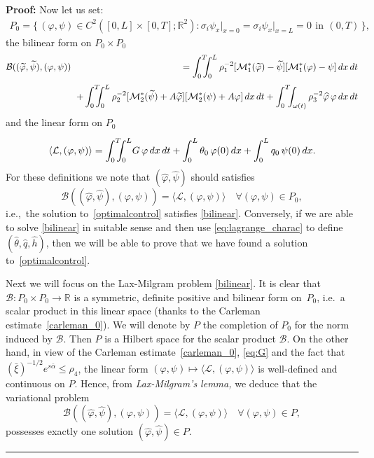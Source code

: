 \documentclass[10pt]{article}
\newenvironment{proof}[1][Proof]
{\noindent\textbf{#1:} }{\hfill\rule{0.5em}{0.5em}}
\def\dis{\displaystyle}
\def\om{\omega}
\def\\Phivec{\mathbf{\Phi}}
\newcommand{\iiTL}{\int_0^T\!\!\!\!\int_0^L }
\begin{document}
\begin{proof}
	Now let us set:
$$
\begin{array}{l}
	\dis P_0 = \bigg\{\, (\varphi,\psi)\in C^{2}([0,L] \times [0,T];\mathbb{R}^2) :
	\sigma_i\psi_{x}\big|_{x=0}=\sigma_i\psi_{x}\big|_{x=L}= 0 \,~\mbox{in}\,~(0,T)\,\bigg\},
\end{array}
$$
	the bilinear form on $P_0\times P_0$
\begin{eqnarray*}
	\mathcal{B}((\widetilde{\varphi},\widetilde{\psi}),(\varphi,\psi))\hspace{-0.5cm}&& \dis =  \iiTL\rho_1^{-2}[\mathcal{M}^*_1(\widetilde{\varphi})- \widetilde{\psi}]
	[\mathcal{M}^*_1(\varphi)-\psi]\,dx\,dt
	\\
	\noalign{\smallskip}
	& & \quad \dis
	+ \iiTL\rho_2^{-2}[\mathcal{M}^*_2(\widetilde{\psi})+A \widetilde{\varphi}]
	[\mathcal{M}^*_2(\psi)+A \varphi]\,dx\,dt + \int_0^T \!\!\!\int_{\om(t)} \rho_3^{-2}\widehat{\varphi}\,\varphi\,dx\,dt
\end{eqnarray*}
	and the linear form on $P_0$
\begin{eqnarray*}
	\noalign{\smallskip}\dis
	\langle \mathcal{L},(\varphi,\psi)\rangle
	= \iiTL\! G\,\varphi \,dx\,dt
	+\int_0^L\theta_0\,\varphi(0)\,dx+\int_0^L q_0\,\psi(0)\,dx\nonumber.
\end{eqnarray*}
	For these definitions we note that $(\widehat{\varphi},\widehat{\psi})$ should satisfies
\begin{equation}\label{bilinear}
	\mathcal{B}((\widehat{\varphi},\widehat{\psi}),(\varphi,\psi))
	= \langle \mathcal{L},(\varphi,\psi)\rangle \quad \forall(\varphi,\psi)\in P_0,
   \end{equation}
	i.e.,~the solution to~\eqref{optimalcontrol} satisfies \eqref{bilinear}.
	Conversely, if we are able to solve \eqref{bilinear} in  suitable sense and then use \eqref{eq:lagrange_charac} to define
	$(\widehat{\theta},\widehat{q},\widehat{h})$, then we will be able to prove that we have found a solution to~\eqref{optimalcontrol}.

	Next we will focus on the Lax-Milgram problem \eqref{bilinear}.
	It is clear that $\mathcal{B}: P_0\times P_0 \to \mathbb{R}$ is a symmetric, definite positive and bilinear
	form on~$P_0$, i.e.~a scalar product in this linear space (thanks to the Carleman estimate~\eqref{carleman_0}). We will denote by $P$ the completion of $P_0$ for the
	norm induced by $\mathcal{B}$. Then $P$ is a Hilbert space for the scalar product $\mathcal{B}$.
	On the other hand, in view of the Carleman estimate~\eqref{carleman_0}, \eqref{eq:G} and the fact that $(\bar\xi)^{-1/2} e^{s\bar\alpha}\leq\rho_4$, the linear form
	$(\varphi,\psi)\mapsto \langle \mathcal{L},(\varphi,\psi)\rangle$ is well-defined and continuous on $P$.
	Hence, from {\it Lax-Milgram's lemma,} we deduce that the variational problem
\begin{equation}\label{eq:lax_milgram_pb}
			\mathcal{B}((\widehat{\varphi},\widehat{\psi}),(\varphi,\psi))
			=\langle \mathcal{L},(\varphi,\psi)\rangle \quad 	\forall (\varphi,\psi)\in P,
\end{equation}
	possesses exactly one solution $(\widehat{\varphi},\widehat{\psi})\in P$.


\end{proof}
\end{document}
